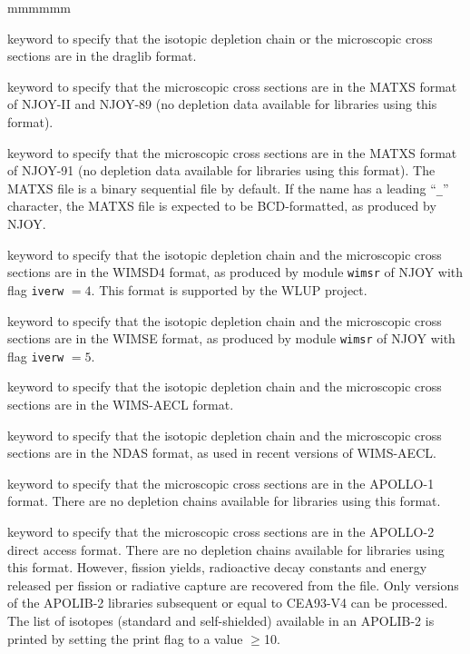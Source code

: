 \begin{ListeDeDescription}{mmmmmm}
\item[\moc{DRAGON}] keyword to specify that the isotopic depletion chain or
the microscopic cross sections are in the {\sc draglib} format.

\item[\moc{MATXS}] keyword to specify that the microscopic cross sections are
in the MATXS format of NJOY-II and NJOY-89 (no depletion data available for
libraries using this format).

\item[\moc{MATXS2}] keyword to specify that the microscopic cross sections are
in the MATXS format of NJOY-91 (no depletion data available for libraries using
this format). The MATXS file is a binary sequential file by default. If the name
 has a leading ``{\tt \_}'' character, the MATXS file is expected to be
BCD-formatted, as produced by NJOY.

\item[\moc{WIMSD4}] keyword to specify that the isotopic depletion chain and the
microscopic cross sections are in the WIMSD4 format, as produced by module {\tt wimsr} of NJOY with flag
{\tt iverw} $=4$. This format is supported by the WLUP project.\cite{wlup}

\item[\moc{WIMSE}] keyword to specify that the isotopic depletion chain and the
microscopic cross sections are in the WIMSE format, as produced by module {\tt wimsr} of NJOY with flag
{\tt iverw} $=5$.

\item[\moc{WIMSAECL}] keyword to specify that the isotopic depletion chain and the
microscopic cross sections are in the WIMS-AECL format.

\item[\moc{NDAS}] keyword to specify that the isotopic depletion chain and the
microscopic cross sections are in the NDAS format, as used in recent versions of WIMS-AECL.

\item[\moc{APLIB1}] keyword to specify that the microscopic cross sections are
in the APOLLO-1 format. There are no depletion chains available for libraries using this
format.

\item[\moc{APLIB2}] keyword to specify that the microscopic cross sections are
in the APOLLO-2 direct access format. There are no depletion chains available for libraries
using this format. However, fission yields, radioactive decay constants and
energy released per fission or radiative capture are recovered from the file.
Only versions of the APOLIB-2 libraries subsequent or equal to CEA93-V4 can be
processed. The list of isotopes (standard and self-shielded) available in an APOLIB-2
is printed by setting the print flag to a value $\ge$10.


\end{ListeDeDescription}
